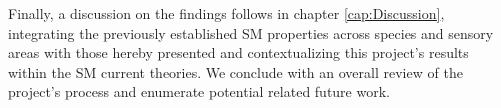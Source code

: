 Finally, a discussion on the findings follows in chapter \ref{cap:Discussion}, integrating the previously established SM properties across species and sensory areas with those hereby presented and contextualizing this project's results within the SM current theories. We conclude with an overall review of the project's process and enumerate potential related future work.





